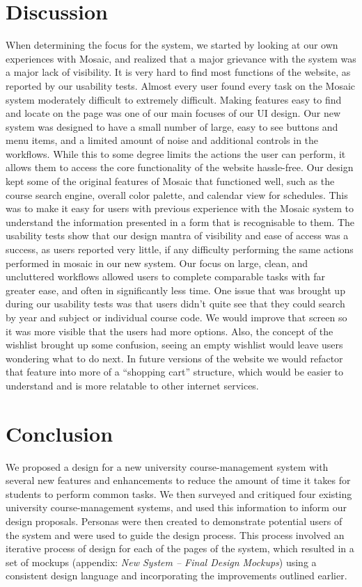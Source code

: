 \documentclass[10pt]{article}
\begin{document}
\begin{multicols}{2}
\section*{Discussion}
When determining the focus for the system, we started by looking at our own experiences with Mosaic, and realized that a major grievance with the system was a major lack of visibility. It is very hard to find most functions of the website, as reported by our usability tests. Almost every user found every task on the Mosaic system moderately difficult to extremely difficult. Making features easy to find and locate on the page was one of our main focuses of our UI design. Our new system was designed to have a small number of large, easy to see buttons and menu items, and a limited amount of noise and additional controls in the workflows. While this to some degree limits the actions the user can perform, it allows them to access the core functionality of the website hassle-free. Our design kept some of the original features of Mosaic that functioned well, such as the course search engine, overall color palette, and calendar view for schedules. This was to make it easy for users with previous experience with the Mosaic system to understand the information presented in a form that is recognisable to them. The usability tests show that our design mantra of visibility and ease of access was a success, as users reported very little, if any difficulty performing the same actions performed in mosaic in our new system. Our focus on large, clean, and uncluttered workflows allowed users to complete comparable tasks with far greater ease, and often in significantly less time. One issue that was brought up during our usability tests was that users didn’t quite see that they could search by year and subject or individual course code. We would improve that screen so it was more visible that the users had more options. Also, the concept of the wishlist brought up some confusion, seeing an empty wishlist would leave users wondering what to do next. In future versions of the website we would refactor that feature into more of a “shopping cart” structure, which would be easier to understand and is more relatable to other internet services.
\section*{Conclusion}
We proposed a design for a new university course-management system with several new features and enhancements to reduce the amount of time it takes for students to perform common tasks. We then surveyed and critiqued four existing university course-management systems, and used this information to inform our design proposals. Personas were then created to demonstrate potential users of the system and were used to guide the design process. This process involved an iterative process of design for each of the pages of the system, which resulted in a set of mockups (appendix: \emph{New System -- Final Design Mockups}) using a consistent design language and incorporating the improvements outlined earlier.\\


\end{multicols}
\end{document}
